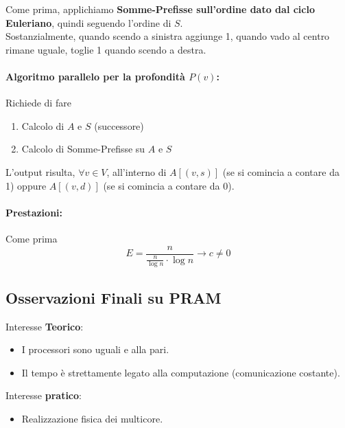 	Come prima, applichiamo \textbf{Somme-Prefisse sull'ordine dato dal ciclo Euleriano}, quindi seguendo l'ordine di $S$.\\
	
	Sostanzialmente, quando scendo a sinistra aggiunge 1, quando vado al centro rimane uguale, toglie 1 quando scendo a destra.\\
	
	\paragraph{Algoritmo parallelo per la profondità $P(v)$:} Richiede di fare
	\begin{enumerate}
		\item Calcolo di $A$ e $S$ (successore)
		\item Calcolo di Somme-Prefisse su $A$ e $S$
	\end{enumerate}
	L'output risulta, $\forall v \in V$, all'interno di $A[(v,s)]$ (se si comincia a contare da 1) oppure $A[(v,d)]$ (se si comincia a contare da 0).\\
	
	\paragraph{Prestazioni:} Come prima
	$$ E = \frac{n}{\frac{n}{\log n} \cdot \log n} \rightarrow c \neq 0 $$
	
	\newpage
	
	\subsection*{Osservazioni Finali su PRAM}
	
	Interesse \textbf{Teorico}: 
	\begin{itemize}
		\item I processori sono uguali e alla pari.\\
		
		\item Il tempo è strettamente legato alla computazione (comunicazione costante).\\
	\end{itemize}
	
	Interesse \textbf{pratico}: 
	\begin{itemize}
		\item Realizzazione fisica dei multicore.\\
	\end{itemize}
	
